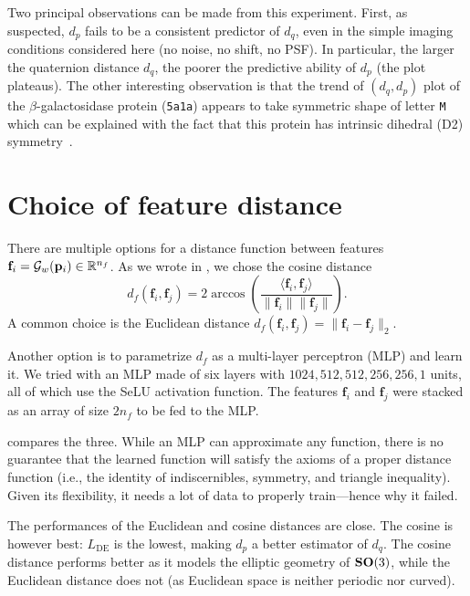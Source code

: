 Two principal observations can be made from this experiment.
First, as suspected, $d_p$ fails to be a consistent predictor of $d_q$, even in the simple imaging conditions considered here (no noise, no shift, no PSF).
In particular, the larger the quaternion distance $d_q$, the poorer the predictive ability of $d_p$ (the plot plateaus).
The other interesting observation is that the trend of $(d_q,d_p)$ plot of the $\beta$-galactosidase protein (\texttt{5a1a}) appears to take symmetric shape of letter \texttt{M} which can be explained with the fact that this protein has intrinsic dihedral (D2) symmetry~\cite{noauthor_d2sym_nodate,noauthor_5a1asym_nodate}.

\section{Choice of feature distance}\label{apx:feature-distance}


There are multiple options for a distance function between features $\mathbf{f}_i = \mathcal{G}_w(\mathbf{p}_i) \in \mathbb{R}^{n_f}$.
As we wrote in , we chose the cosine distance
\begin{equation*}
    d_f(\mathbf{f}_i,\mathbf{f}_j) = 2 \arccos \left( \frac{\langle \mathbf{f}_i, \mathbf{f}_j \rangle}{\lVert \mathbf{f}_i \rVert \lVert \mathbf{f}_j \rVert} \right).
\end{equation*}
A common choice is the Euclidean distance $d_f(\mathbf{f}_i, \mathbf{f}_j) = \| \mathbf{f}_i - \mathbf{f}_j \|_2$.

Another option is to parametrize $d_f$ as a multi-layer perceptron (MLP) and learn it.
We tried with an MLP made of six layers with $1024, 512, 512, 256, 256, 1$ units, all of which use the SeLU activation function.
The features $\mathbf{f}_i$ and $\mathbf{f}_j$ were stacked as an array of size $2n_f$ to be fed to the MLP.

 compares the three.
While an MLP can approximate any function, there is no guarantee that the learned function will satisfy the axioms of a proper distance function (i.e., the identity of indiscernibles, symmetry, and triangle inequality).
Given its flexibility, it needs a lot of data to properly train---hence why it failed.

The performances of the Euclidean and cosine distances are close.
The cosine is however best: $L_\text{DE}$ is the lowest, making $d_p$ a better estimator of $d_q$.
The cosine distance performs better as it models the elliptic geometry of $\mathrm{\mathbf{SO}}(3)$, while the Euclidean distance does not (as Euclidean space is neither periodic nor curved).

